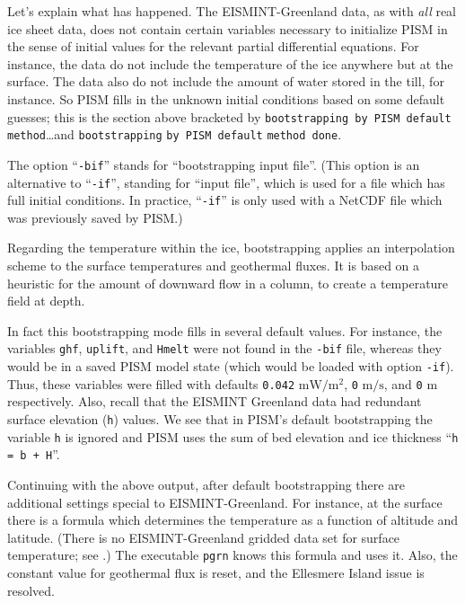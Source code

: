 \documentclass[11pt,final]{amsart}
\begin{document}
\noindent Let's explain what has happened.  The EISMINT-Greenland data, as with \emph{all} real ice sheet data, does not contain certain variables necessary to initialize PISM in the sense of initial values for the relevant partial differential equations.  For instance, the data do not include the temperature of the ice anywhere but at the surface.  The data also do not include the amount of water stored in the till, for instance.  So PISM fills in the unknown initial conditions based on some default guesses; this is the section above bracketed by \verb|bootstrapping by PISM default method|\dots and \verb|bootstrapping| \verb|by PISM default| \verb|method done|. 

The option ``\verb|-bif|'' stands for ``bootstrapping input file''.  (This option is an alternative to ``\verb|-if|'', standing for ``input file'', which is used for a file which has full initial conditions.  In practice, ``\verb|-if|'' is only used with a NetCDF file which was previously saved by PISM.)

Regarding the temperature within the ice, bootstrapping applies an interpolation scheme to the surface temperatures and geothermal fluxes.  It is based on a heuristic for the amount of downward flow in a column, to create a temperature field at depth.  %

In fact this bootstrapping mode fills in several default values.  For instance, the variables \verb|ghf|, \verb|uplift|, and \verb|Hmelt| were not found in the \verb|-bif| file, whereas they would be in a saved PISM model state (which would be loaded with option \verb|-if|).  Thus, these variables were filled with defaults \verb|0.042| $\text{mW}/\text{m}^2$, \verb|0| $\text{m}/\text{s}$, and \verb|0| m respectively.  Also, recall that the EISMINT Greenland data had redundant surface elevation (\verb|h|) values.  We see that in PISM's default bootstrapping the variable \verb|h| is ignored and PISM uses the sum of bed elevation and ice thickness ``\verb|h = b + H|''.

Continuing with the above output, after default bootstrapping there are additional settings special to EISMINT-Greenland.  For instance, at the surface there is a formula which determines the temperature as a function of altitude and latitude.  (There is no EISMINT-Greenland gridded data set for surface temperature; see \cite{RitzEISMINT}.)  The executable \verb|pgrn| knows this formula and uses it.  Also, the constant value for geothermal flux is reset, and the Ellesmere Island issue is resolved.
\end{document}
